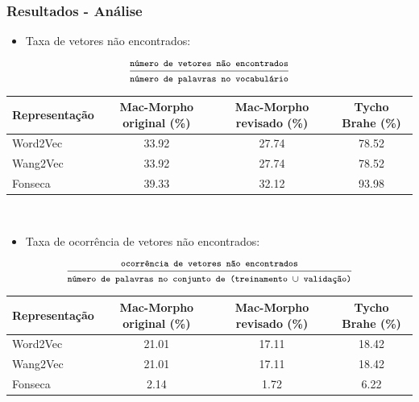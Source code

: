 \documentclass[10pt]{beamer}
\begin{document}
\begin{frame}[fragile]
  \frametitle{Resultados - Análise}

  \begin{itemize}
    \item Taxa de vetores não encontrados:
  \end{itemize}

  \vspace{-0.25cm}

  \begin{equation} \nonumber
  \frac{\mbox{\footnotesize{\texttt{número de vetores não encontrados}}}}{\mbox{\footnotesize{\texttt{número de palavras no vocabulário}}}}
  \end{equation}

  \vspace{-0.4cm}

  \begin{table}[!htb]
  \scriptsize
  \centering
  \begin{tabular}{lccc}
    \toprule
    \textbf{Representação} & \textbf{Mac-Morpho original (\%)}  & \textbf{Mac-Morpho revisado (\%)} & \textbf{Tycho Brahe (\%)} \\
    \midrule
    Word2Vec  & 33.92 & 27.74 & 78.52 \\ 
    Wang2Vec  & 33.92 & 27.74 & 78.52 \\
    Fonseca   & 39.33 & 32.12 & 93.98 \\
    \bottomrule
  \end{tabular}
  \end{table}

  \ 

  \begin{itemize}
    \item Taxa de ocorrência de vetores não encontrados:
  \end{itemize}

  \vspace{-0.25cm}

  \begin{equation} \nonumber
  \frac{\mbox{\footnotesize{\texttt{ocorrência de vetores não encontrados}}}}{\mbox{\footnotesize{\texttt{número de palavras no conjunto de (treinamento $\cup$ validação)}}}}
  \end{equation}

  \vspace{-0.4cm}

  \begin{table}[!htb]
  \scriptsize
  \centering
  \begin{tabular}{lccc}
    \toprule
    \textbf{Representação} & \textbf{Mac-Morpho original (\%)}  & \textbf{Mac-Morpho revisado (\%)} & \textbf{Tycho Brahe (\%)} \\
    \midrule
    Word2Vec  & 21.01 & 17.11 & 18.42 \\
    Wang2Vec  & 21.01 & 17.11 & 18.42 \\
    Fonseca   & 2.14  & 1.72  & 6.22 \\ 
    \bottomrule
  \end{tabular}
  \end{table}



\end{frame}
\end{document}
